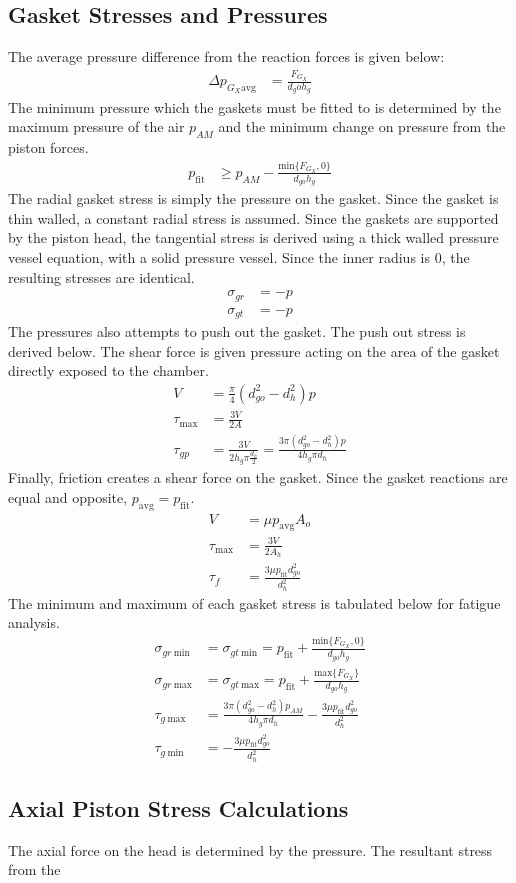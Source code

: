 \documentclass[10pt,a4paper]{article}
\begin{document}
	\subsection*{Gasket Stresses and Pressures}
	The average pressure difference from the reaction forces is given below:
	\begin{align}
	 \Delta p_{G_X \text{avg}} &= \frac{F_{G_X}}{d_go h_g}
	\end{align}
	The minimum pressure which the gaskets must be fitted to is determined by the maximum pressure of the air $p_{AM}$ and the minimum change on pressure from the piston forces.
	\begin{align}
	p_{\text{fit}} &\geq p_{AM} - \frac{\text{min} \{ F_{G_X}, 0 \}}{d_{go} h_g}
	\end{align}
	The radial gasket stress is simply the pressure on the gasket. Since the gasket is thin walled, a constant radial stress is assumed.
	Since the gaskets are supported by the piston head, the tangential stress is derived using a thick walled pressure vessel equation, with a solid pressure vessel. Since the inner radius is 0, the resulting stresses are identical.
	\begin{align}
		\sigma_{gr} &= -p\\
		\sigma_{gt} &= -p
	\end{align}
	The pressures also attempts to push out the gasket. The push out stress is derived below. The shear force is given pressure acting on the area of the gasket directly exposed to the chamber.
	\begin{align}
	 V &= \frac{\pi}{4}(d_{go}^2-d_{h}^2) p\\
	 \tau_{\text{max}} &= \frac{3V}{2A} \\
	 \tau_{gp} &= \frac{3V}{2 h_g \pi \frac{d_h}{2} } = \frac{3 \pi (d_{go}^2-d_{h}^2) p}{4 h_g \pi d_h} 
	\end{align}
	Finally, friction creates a shear force on the gasket. Since the gasket reactions are equal and opposite, $p_{\text{avg}} = p_{\text{fit}}$.
	\begin{align}
		V &=  \mu p_{\text{avg}} A_o \\
		\tau_{\text{max}} &= \frac{3V}{2A_h} \\
		\tau_{f} &= \frac{3 \mu p_{\text{fit}} d_{go}^2}{d_h^2} 
	\end{align}
	The minimum and maximum of each gasket stress is tabulated below for fatigue analysis.
	\begin{align}
		\sigma_{gr\ \text{min}} &= \sigma_{gt\ \text{min}} = p_{\text{fit}} + \frac{\text{min} \{ F_{G_X}, 0 \}}{d_{go} h_g}\\
		\sigma_{gr\ \text{max}} &= \sigma_{gt\ \text{max}} = p_{\text{fit}} + \frac{\text{max} \{ F_{G_X}\}}{d_{go} h_g}\\
		\tau_{g\ \text{max}} &= \frac{3 \pi (d_{go}^2-d_{h}^2) p_{AM}}{4 h_g \pi d_h} - \frac{3 \mu p_{\text{fit}} d_{go}^2}{d_h^2}\\
		\tau_{g\  \text{min}} &= -\frac{3 \mu p_{\text{fit}} d_{go}^2}{d_h^2}
	\end{align}
	\subsection*{Axial Piston Stress Calculations}
	The axial force on the head is determined by the pressure. The resultant stress from the 
\end{document}
